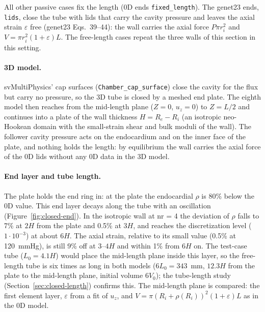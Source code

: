 All other passive cases fix the length (0D ends \texttt{fixed\_length}). The genet23 ends,
\texttt{lids}, close the tube with lids that carry the cavity pressure and
leaves the axial strain $\varepsilon$ free (genet23 Eqs.~39--44): the wall carries the
axial force $P\pi r_i^2$ and $V = \pi r_i^2 (1+\varepsilon) L$. The free-length cases
repeat the three walls of this section in this setting.

\paragraph{3D model.} svMultiPhysics' cap surfaces (\texttt{Chamber\_cap\_surface}) close
the cavity for the flux but carry no pressure, so the 3D tube is closed by a meshed end
plate. The eighth model then reaches from the mid-length plane ($Z = 0$, $u_z = 0$) to
$Z = L/2$ and continues into a plate of the wall thickness $H = R_e - R_i$ (an isotropic
neo-Hookean domain with the small-strain shear and bulk moduli of the wall). The follower
cavity pressure acts on the endocardium and on the inner face of the plate, and nothing
holds the length: by equilibrium the wall carries the axial force of the 0D lids without
any 0D data in the 3D model.

\paragraph{End layer and tube length.} The plate holds the end ring in: at the plate the
endocardial $\rho$ is 80\% below the 0D value. This end layer decays along the tube with
an oscillation (Figure~\ref{fig:closed-end}). In the isotropic wall at nr = 4 the
deviation of $\rho$ falls to 7\% at $2H$ from the plate and 0.5\% at $3H$, and reaches the
discretization level ($1\cdot10^{-3}$) at about $6H$. The axial strain, relative to its
small value (0.5\% at 120~mmHg), is still 9\% off at $3$--$4H$ and within 1\% from
$6H$ on. The test-case tube ($L_0 = 4.1H$) would place the mid-length plane inside this
layer, so the free-length tube is six times as long in both models
($6L_0 = 343$~mm, $12.3H$ from the plate to the mid-length plane, initial volume
$6V_0$); the tube-length study (Section~\ref{sec:closed-length}) confirms this. The mid-length plane is compared: the
first element layer, $\varepsilon$ from a fit of $u_z$, and
$V = \pi(R_i + \rho(R_i))^2 (1+\varepsilon) L$ as in the 0D model.

